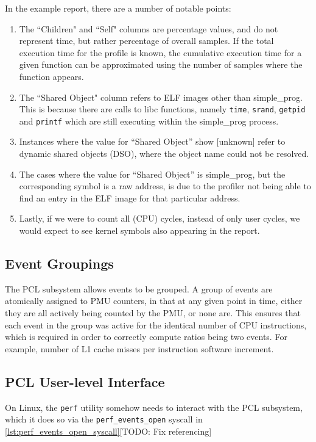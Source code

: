 In the example report, there are a number of notable points:
\ssp
\begin{enumerate}
    \item The ``Children" and ``Self" columns are percentage values, and do not represent time, but rather percentage of overall samples. If the total execution time for the profile is known, the cumulative execution time for a given function can be approximated using the number of samples where the function appears. 
    \item The ``Shared Object" column refers to ELF images other than simple\_prog. This is because there are calls to libc functions, namely \texttt{time}, \texttt{srand}, \texttt{getpid} and \texttt{printf} which are still executing within the simple\_prog process.
    \item Instances where the value for ``Shared Object'' show [unknown] refer to dynamic shared objects (DSO), where the object name could not be resolved.
    \item The cases where the value for ``Shared Object'' is simple\_prog, but the corresponding symbol is a raw address, is due to the profiler not being able to find an entry in the ELF image for that particular address.
    \item Lastly, if we were to count all (CPU) cycles, instead of only user cycles, we would expect to see kernel symbols also appearing in the report.
\end{enumerate}
\dsp

\subsection{Event Groupings}\label{sect:event_groupings}

The PCL subsystem allows events to be grouped. A group of events are atomically assigned to PMU counters, in that at any given point in time, either they are all actively being counted by the PMU, or none are. This ensures that each event in the group was active for the identical number of CPU instructions, which is required in order to correctly compute ratios being two events. For example, number of L1 cache misses per instruction software increment.

\subsection{PCL User-level Interface}\label{sect:perf_event_open}

On Linux, the \texttt{perf} utility somehow needs to interact with the PCL subsystem, which it does so via the \texttt{perf\_events\_open} syscall in \ref{lst:perf_events_open_syscall}[TODO: Fix referencing]

